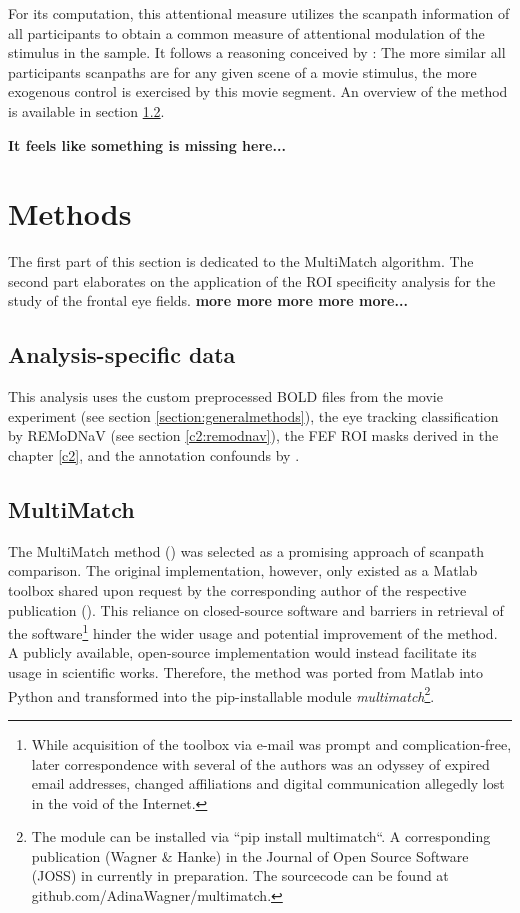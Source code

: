 \documentclass[a4paper, 12pt]{scrreprt}
\begin{document}
For its computation, this attentional measure utilizes the scanpath information of all participants to obtain a common measure of attentional modulation of the stimulus in the sample. It follows a reasoning conceived by \textcite{baumgartner}: The more similar all participants scanpaths are for any given scene of a movie stimulus, the more exogenous control is exercised by this movie segment.
An overview of the method is available in section \ref{section:multimatch}.
 
 
 \textbf{It feels like something is missing here...}
 
\section{Methods}
The first part of this section is dedicated to the MultiMatch algorithm. The second part elaborates on the application of the ROI specificity analysis for the study of the frontal eye fields.
\textbf{more more more more more...}
\subsection{Analysis-specific data}

This analysis uses the custom preprocessed BOLD files from the movie experiment (see section \ref{section:generalmethods}), the eye tracking classification by REMoDNaV (see section \ref{c2:remodnav}), the FEF ROI masks derived in the chapter \ref{c2}, and the annotation confounds by \textcite{hausler2016annotation}.

\subsection{MultiMatch}\label{section:multimatch}

The MultiMatch method (\cite{jarodzka2010vector}) was selected as a promising approach of scanpath comparison. The original implementation, however, only existed as a Matlab toolbox shared upon request by the corresponding author of the respective publication (\cite{dewhurst2012depends}). This reliance on closed-source software and barriers in retrieval of the software\footnote{While acquisition of the toolbox via e-mail was prompt and complication-free, later correspondence with several of the authors was an odyssey of expired email addresses, changed affiliations and digital communication allegedly lost in the void of the Internet.} hinder the wider usage and potential improvement of the method. A publicly available, open-source implementation would instead facilitate its usage in scientific works. Therefore, the method was ported from Matlab into Python and transformed into the pip-installable module \textit{multimatch}\footnote{The module can be installed via ``pip install multimatch``. A corresponding publication (Wagner \& Hanke) in the Journal of Open Source Software (JOSS) in currently in preparation. The sourcecode can be found at github.com/AdinaWagner/multimatch.}.
\end{document}
